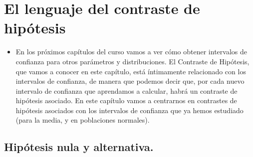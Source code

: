 \section{El lenguaje del contraste de hipótesis}

\begin{itemize}

    \item En los próximos capítulos del curso vamos a ver cómo obtener intervalos de confianza para otros parámetros y distribuciones. El Contraste de Hipótesis, que vamos a conocer en este capítulo, está íntimamente relacionado con los intervalos de confianza, de manera que podemos decir que, por cada nuevo intervalo de confianza que aprendamos a calcular, habrá un contraste de hipótesis asociado. En este capítulo vamos a centrarnos en contrastes de hipótesis asociados con los intervalos de confianza que ya hemos estudiado (para la media, y en poblaciones normales).
\end{itemize}



\subsection*{Hipótesis nula y alternativa.}

